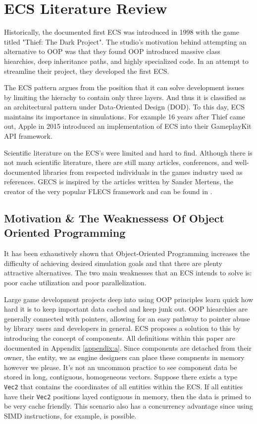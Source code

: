 \section{ECS Literature Review}
\label{chap:1}

Historically, the documented first ECS was introduced in 1998 with the game titled "Thief: The Dark Project".\cite{RomeoPHD} The studio's motivation behind attempting an alternative to OOP was that they found OOP introduced massive class hiearchies, deep inheritance paths, and highly specialized code. In an attempt to streamline their project, they developed the first ECS.\cite{Haerkoenen2019}

The ECS pattern argues from the position that it can solve development issues by limiting the hierachy to contain only three layers. And thus it is classified as an architectural pattern under Data-Oriented Design (DOD).\cite{RomeoPHD} To this day, ECS maintains its importance in simulations. For example 16 years after Thief came out, Apple in 2015 introduced an implementation of ECS into their GameplayKit API framework. \cite{AppleECS}

Scientific literature on the ECS's were limited and hard to find. Although there is not much scientific literature, there are still many articles, conferences, and well-documented libraries from respected individuals in the games industry used as references. GECS is inspired by the articles written by Sander Mertens, the creator of the very popular FLECS framework and can be found in \cite{SanderMertensECS}. 

\subsection{Motivation \& The Weaknessess Of Object Oriented Programming}

It has been exhaustively shown that Object-Oriented Programming increases the difficulty of achieving desired simulation goals and that there are plenty attractive alternatives. The two main weaknesses that an ECS intends to solve is: poor cache utilization and poor parallelization.\cite{RomeoPHD}

Large game development projects deep into using OOP principles learn quick how hard it is to keep important data cached and keep junk out. OOP hiearchies are generally connected with pointers, allowing for an easy pathway to pointer abuse by library users and developers in general. ECS proposes a solution to this by introducing the concept of components. All definitions within this paper are documented in Appendix \ref{appendix:a}. Since components are detached from their owner, the entity, we as engine designers can place these compnents in memory however we please. It's not an uncommon practice to see component data be stored in long, contiguous, homogeneous vectors. Suppose there exists a type \texttt{Vec2} that contains the coordinates of all entities within the ECS. If all entities have their \texttt{Vec2} positions layed contiguous in memory, then the data is primed to be very cache friendly. \cite{Wiebusch2012}\cite{SanderMertensECS} This scenario also has a concurrency advantage since using SIMD instructions, for example, is possible. 

